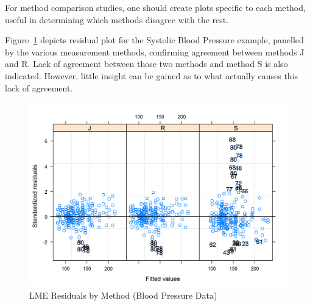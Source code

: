 \documentclass[12pt, a4paper]{report}
\theoremstyle{definition}
\theoremstyle{remark}
\begin{document}
For method comparison studies, one should create plots specific to each method, useful in determining which methods disagree with the rest.

Figure~\ref{bloodnlme-ResidPlot} depicts residual plot for the Systolic Blood Pressure example, panelled by the various measurement methods, confirming agreement between methods J and R. Lack of agreement between those two methods and method S is also indicated. However, little insight can be gained as to what actually causes this lack of agreement. 
\begin{figure}[h!]
	\centering
	\includegraphics[width=0.8\linewidth]{images/bloodnlme-ResidPlot}
	\caption{LME Residuals by Method (Blood Pressure Data)}
	\label{bloodnlme-ResidPlot}
\end{figure}





%


\end{document}
